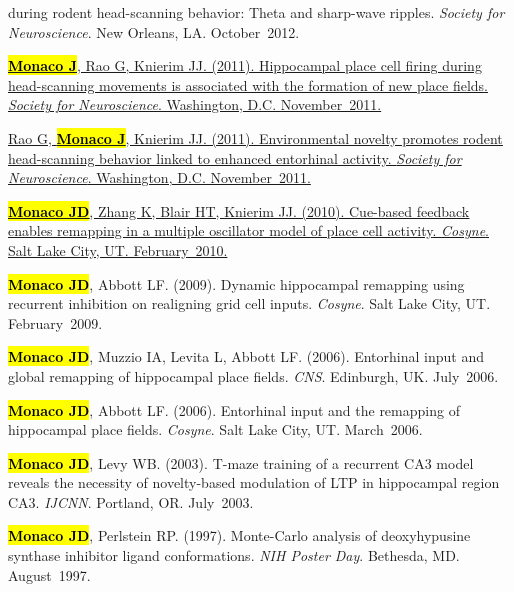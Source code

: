 \documentclass[10pt]{article}
\newcommand{\itemtitle}[1]{{\color{hopkinsblue}\ul{#1}}}
\newcommand{\unpubtitle}[1]{{\color{hopkinsblue} #1}}
\newcommand{\joehl}[1]{\hl{\textbf{#1}}}
\begin{document}
\begin{description}
{{      during rodent head-scanning behavior: Theta and sharp-wave ripples}.
    \emph{Society for Neuroscience}. New Orleans, LA. October~2012.}
  \item[\quad]
    \href{http://www.abstractsonline.com/Plan/ViewAbstract.aspx?sKey=c48e9f5f-1274-4486-85bf-38ee591629e1&cKey=190bd951-c183-428d-a4c5-01eb61556d79&mKey=8334BE29-8911-4991-8C31-32B32DD5E6C8}
    {\joehl{Monaco J}, Rao G, Knierim JJ. (2011). \itemtitle{Hippocampal place
        cell firing during head-scanning movements is associated with the formation
    of new place fields}. \emph{Society for Neuroscience}. Washington, D.C. November~2011.}
  \item[\quad]
    \href{http://www.abstractsonline.com/Plan/ViewAbstract.aspx?sKey=c48e9f5f-1274-4486-85bf-38ee591629e1&cKey=3ec26e6f-8c59-4be2-bad3-e1572d75e07e&mKey=8334BE29-8911-4991-8C31-32B32DD5E6C8}
    {Rao G, \joehl{Monaco J}, Knierim JJ. (2011). \itemtitle{Environmental
        novelty promotes rodent head-scanning behavior linked to enhanced entorhinal
      activity}. \emph{Society for Neuroscience}. Washington,
    D.C. November~2011.}
  \item[\quad]
    \href{http://www.frontiersin.org/10.3389/conf.fnins.2010.03.00192/event_abstract}
    {\joehl{Monaco JD}, Zhang K, Blair HT, Knierim JJ. (2010).
    \itemtitle{Cue-based feedback enables remapping in a multiple oscillator
      model of place cell activity}. \emph{Cosyne}. Salt Lake City, UT.
    February~2010.}
  \item[\quad] \joehl{Monaco JD}, Abbott LF. (2009). \unpubtitle{Dynamic
      hippocampal remapping using recurrent inhibition on realigning grid cell
    inputs}. \emph{Cosyne}. Salt Lake City, UT. February~2009.
  \item[\quad] \joehl{Monaco JD}, Muzzio IA, Levita L, Abbott LF. (2006).
    \unpubtitle{Entorhinal input and global remapping of hippocampal place
    fields}. \emph{CNS}. Edinburgh, UK. July~2006.
  \item[\quad] \joehl{Monaco JD}, Abbott LF. (2006). \unpubtitle{Entorhinal
    input and the remapping of hippocampal place fields}. \emph{Cosyne}. Salt Lake
    City, UT. March~2006.
  \item[\quad] \joehl{Monaco JD}, Levy WB. (2003). \unpubtitle{T-maze training
      of a recurrent CA3 model reveals the necessity of novelty-based modulation of
    LTP in hippocampal region CA3}. \emph{IJCNN}. Portland, OR. July~2003.
  \item[\quad] \joehl{Monaco JD}, Perlstein RP. (1997). \unpubtitle{Monte-Carlo
      analysis of deoxyhypusine synthase inhibitor ligand conformations}. \emph{NIH
    Poster Day}. Bethesda, MD. August~1997.
\end{description}
\end{document}
